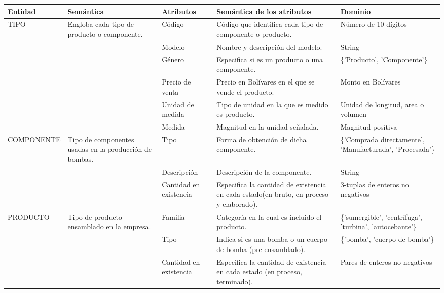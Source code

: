 \documentclass[]{report}
\begin{document}
	\begin{center}
		\begin{tabular}{| p{2.5cm} | p{4.5cm} | p{2cm} | p{5cm} | p{3cm}|}
					\hline
			Entidad & Semántica & Atributos & Semántica de los atributos & Dominio \\ \hline
			
			TIPO & Engloba cada tipo de producto o componente. & 
			
			Código & Código que identifica cada tipo de componente o producto. & Número de 10 dígitos\\ \cline{3-5}
			&& Modelo & Nombre y descripción del modelo. & String\\ \cline{3-5}
			&& Género & Especifica si es un producto o una componente. & \{'Producto', 'Componente'\} \\ \cline{3-5}
			&& Precio de venta & Precio en Bolívares en el que se vende el producto.& Monto en Bolívares\\ \cline{3-5}
			&& Unidad de medida & Tipo de unidad en la que es medido es producto.&Unidad de longitud, area o volumen\\ \cline{3-5}
			&& Medida & Magnitud en la unidad señalada.& Magnitud positiva\\ \cline{3-5}
			\hline
			
			
			
			COMPONENTE & Tipo de componentes usadas en la producción de bombas. &
			Tipo & Forma de obtención de dicha componente.& \{'Comprada directamente', 'Manufacturada', 'Procesada'\}\\ \cline{3-5}
			&& Descripción & Descripción de la componente.& String\\ \cline{3-5}
			&& Cantidad en existencia & Especifica la cantidad de existencia en cada estado(en bruto, en proceso y elaborado).& 3-tuplas de enteros no negativos\\ \cline{3-5}
			\hline
			
			PRODUCTO & Tipo de producto ensamblado en la empresa. &
			Familia & Categoría en la cual es incluido el producto.& \{'sumergible', 'centrífuga', 'turbina', 'autocebante'\}\\ \cline{3-5}
			&& Tipo & Indica si es una bomba o un cuerpo de bomba (pre-ensamblado).& \{'bomba', 'cuerpo de bomba'\}\\ \cline{3-5}
			&& Cantidad en existencia & Especifica la cantidad de existencia en cada estado (en proceso, terminado).& Pares de enteros no negativos\\ \cline{3-5}
			\hline
			

\end{tabular}
\end{center}
\end{document}
